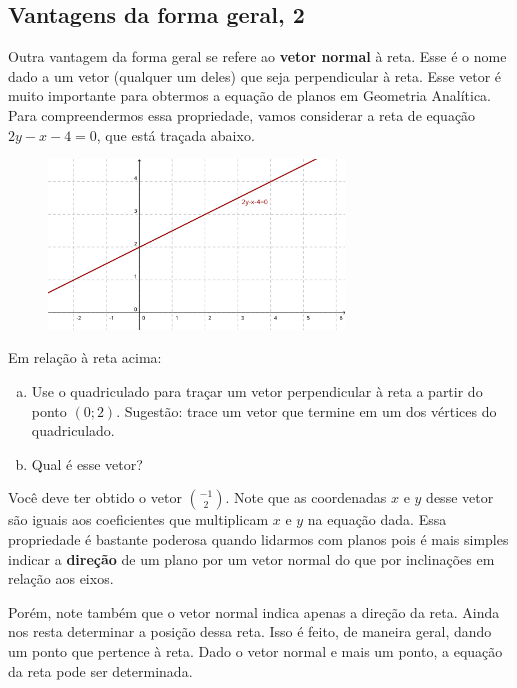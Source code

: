 \documentclass[main_estudante.tex]{subfiles}
\begin{document}
\subsection*{Vantagens da forma geral, 2}

Outra vantagem da forma geral se refere ao \textbf{vetor normal} à reta. Esse é o nome dado a um vetor (qualquer um deles) que seja perpendicular à reta. Esse vetor é muito importante para obtermos a equação de planos em Geometria Analítica. Para compreendermos essa propriedade, vamos considerar a reta de equação $2y-x-4=0$, que está traçada abaixo.

\begin{figure}[h]
\centering
\includegraphics[width=0.7\textwidth]{./img/c6q8.png}
\end{figure}

\begin{questao}
Em relação à reta acima:
\begin{enumerate}[a)]
\item Use o quadriculado para traçar um vetor perpendicular à reta a partir do ponto $(0;2)$. Sugestão: trace um vetor que termine em um dos vértices do quadriculado.
\item Qual é esse vetor?
\end{enumerate} 
\end{questao}

Você deve ter obtido o vetor $\binom{-1}{2}$. Note que as coordenadas $x$ e $y$ desse vetor são iguais aos coeficientes que multiplicam $x$ e $y$ na equação dada. Essa propriedade é bastante poderosa quando lidarmos com planos pois é mais simples indicar a \textbf{direção} de um plano por um vetor normal do que por inclinações em relação aos eixos.

Porém, note também que o vetor normal indica apenas a direção da reta. Ainda nos resta determinar a posição dessa reta. Isso é feito, de maneira geral, dando um ponto que pertence à reta. Dado o vetor normal e mais um ponto, a equação da reta pode ser determinada. 
\end{document}
